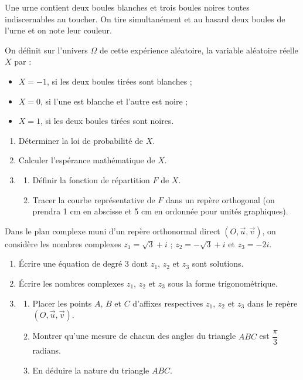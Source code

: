 \documentclass[11pt]{article}
\begin{document}


Une urne contient deux boules blanches et trois boules noires toutes indiscernables au toucher. On tire simultanément et au hasard deux boules de l'urne et on note leur couleur.

On définit sur l'univers $\Omega$ de cette expérience aléatoire, la variable aléatoire réelle $X$ par :
\begin{itemize}
  \item $X = -1$, si les deux boules tirées sont blanches ;
  \item $X = 0$, si l'une est blanche et l'autre est noire ;
  \item $X = 1$, si les deux boules tirées sont noires.
\end{itemize}

\begin{enumerate}
  \item Déterminer la loi de probabilité de $X$.
  \item Calculer l'espérance mathématique de $X$.
  \item \begin{enumerate}[label=\alph*.]
    \item Définir la fonction de répartition $F$ de $X$.
    \item Tracer la courbe représentative de $F$ dans un repère orthogonal (on prendra 1 cm en abscisse et 5 cm en ordonnée pour unités graphiques).
  \end{enumerate}
\end{enumerate}


Dans le plan complexe muni d'un repère orthonormal direct $(O,\vec{u},\vec{v})$, on considère les nombres complexes $z_1 = \sqrt{3} + i$ ; $z_2 = -\sqrt{3} + i$ et $z_3 = -2i$.

\begin{enumerate}
  \item Écrire une équation de degré 3 dont $z_1$, $z_2$ et $z_3$ sont solutions.
  \item Écrire les nombres complexes $z_1$, $z_2$ et $z_3$ sous la forme trigonométrique.
  \item \begin{enumerate}[label=\alph*.]
    \item Placer les points $A$, $B$ et $C$ d'affixes respectives $z_1$, $z_2$ et $z_3$ dans le repère $(O,\vec{u},\vec{v})$.
    \item Montrer qu'une mesure de chacun des angles du triangle $ABC$ est $\dfrac{\pi}{3}$ radians.
    \item En déduire la nature du triangle $ABC$.
  \end{enumerate}
\end{enumerate}
\end{document}
